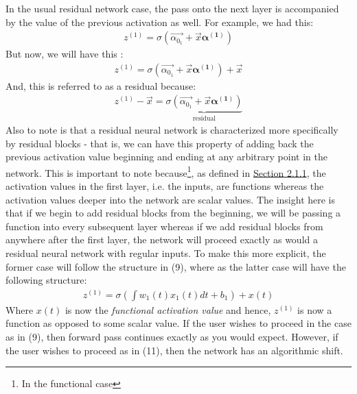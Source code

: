 \documentclass{article}
\begin{document}
\noindent In the usual residual network case, the pass onto the next layer is accompanied by the value of the previous activation as well. For example, we had this:
\begin{align}
    z^{(1)} = \sigma(\vec{\alpha_{0_{1}}} + \vec{x}\boldsymbol{\alpha^{(1)}})
\end{align}
\noindent But now, we will have this \cite{resnet}:
\begin{align}
    z^{(1)} = \sigma(\vec{\alpha_{0_{1}}} + \vec{x}\boldsymbol{\alpha^{(1)}}) + \vec{x}
\end{align}
\noindent And, this is referred to as a residual because:
\begin{align}
    z^{(1)} - \vec{x} = \underbrace{\sigma(\vec{\alpha_{0_{1}}} + \vec{x}\boldsymbol{\alpha^{(1)}})}_\text{residual}
\end{align}
\noindent Also to note is that a residual neural network is characterized more specifically by residual blocks - that is, we can have this property of adding back the previous activation value beginning and ending at any arbitrary point in the network. This is important to note because\footnote{In the functional case}, as defined in \hyperref[sec:funcFeedNN]{Section 2.1.1}, the activation values in the first layer, i.e. the inputs, are functions whereas the activation values deeper into the network are scalar values. The insight here is that if we begin to add residual blocks from the beginning, we will be passing a function into every subsequent layer whereas if we add residual blocks from anywhere after the first layer, the network will proceed exactly as would a residual neural network with regular inputs. To make this more explicit, the former case will follow the structure in (9), where as the latter case will have the following structure:
\begin{align}
    z^{(1)} = \sigma(\int w_{1}(t)x_{1}(t)dt + b_{1}) + x(t)
\end{align}
\noindent Where $x(t)$ is now the \textit{functional activation value} and hence, $z^{(1)}$ is now a function as opposed to some scalar value. If the user wishes to proceed in the case as in (9), then forward pass continues exactly as you would expect. However, if the user wishes to proceed as in (11), then the network has an algorithmic shift.
\end{document}
